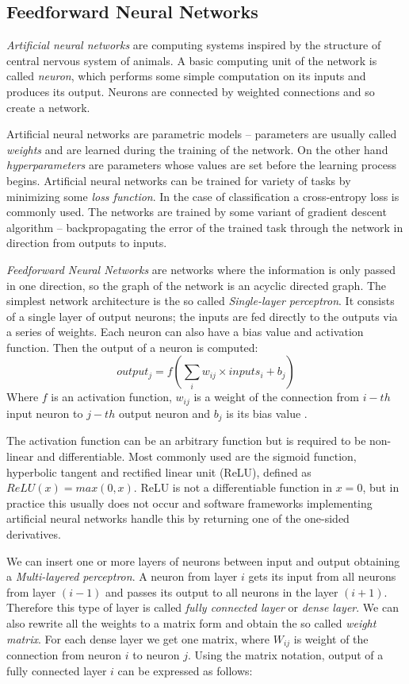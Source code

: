 \subsection{Feedforward Neural Networks}
\textit{Artificial neural networks} are computing systems inspired by the structure of central nervous system of animals. A basic computing unit of the network is called \textit{neuron}, which performs some simple computation on its inputs and produces its output. Neurons are connected by weighted connections and so create a network. \par
Artificial neural networks are parametric models -- parameters are usually called \textit{weights} and are learned during the training of the network. On the other hand \textit{hyperparameters} are parameters whose values are set before the learning process begins. Artificial neural networks can be trained for variety of tasks by minimizing some \textit{loss function}. In the case of classification a cross-entropy loss is commonly used. The networks are trained by some variant of gradient descent algorithm -- backpropagating the error of the trained task through the network in direction from outputs to inputs. \par
\textit{Feedforward Neural Networks} are networks where the information is only passed in one direction, so the graph of the network is an acyclic directed graph. The simplest network architecture is the so called \textit{Single-layer perceptron}. It consists of a single layer of output neurons; the inputs are fed directly to the outputs via a series of weights. Each neuron can also have a bias value and activation function. Then the output of a neuron is computed: $$output_j = f(\sum_{i} {w_{ij}\times inputs_i + b_j})$$ Where $f$ is an activation function, $w_{ij}$ is a weight of the connection from $i-th$ input neuron to $j-th$ output neuron and $b_j$ is its bias value .

The activation function can be an arbitrary function but is required to be non-linear and differentiable. Most commonly used are the sigmoid function, hyperbolic tangent and rectified linear unit (ReLU), defined as $ReLU(x) = max(0,x)$. ReLU is not a differentiable function in $x=0$, but in practice this usually does not occur and software frameworks implementing artificial neural networks handle this by returning one of the one-sided derivatives.\par  
We can insert one or more layers of neurons between input and output obtaining a \textit{Multi-layered perceptron}. A neuron from layer $i$ gets its input from all neurons from layer $(i-1)$ and passes its output to all neurons in the layer $(i+1)$. Therefore this type of layer is called \textit{fully connected layer} or \textit{dense layer}.  We can also rewrite all the weights to a matrix form and obtain the so called \textit{weight matrix}. For each dense layer we get one matrix, where $W_{ij}$ is weight of the connection from neuron $i$ to neuron $j$. Using the matrix notation, output of a fully connected layer $i$ can be expressed as follows: 
